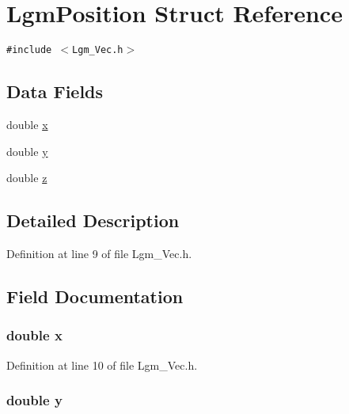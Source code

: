 \hypertarget{struct_lgm_position}{
\section{LgmPosition Struct Reference}
\label{struct_lgm_position}
}
{\tt \#include $<$Lgm\_\-Vec.h$>$}

\subsection*{Data Fields}
\begin{CompactItemize}
\item 
double \hyperlink{struct_lgm_position_f88b946fb90d5f08b5fb740c70e98c10}{x}
\item 
double \hyperlink{struct_lgm_position_b927965981178aa1fba979a37168db2a}{y}
\item 
double \hyperlink{struct_lgm_position_b3e6ed577a7c669c19de1f9c1b46c872}{z}
\end{CompactItemize}


\subsection{Detailed Description}


Definition at line 9 of file Lgm\_\-Vec.h.

\subsection{Field Documentation}
\hypertarget{struct_lgm_position_f88b946fb90d5f08b5fb740c70e98c10}{
\subsubsection[{x}]{\setlength{\rightskip}{0pt plus 5cm}double {\bf x}}}
\label{struct_lgm_position_f88b946fb90d5f08b5fb740c70e98c10}




Definition at line 10 of file Lgm\_\-Vec.h.\hypertarget{struct_lgm_position_b927965981178aa1fba979a37168db2a}{
\subsubsection[{y}]{\setlength{\rightskip}{0pt plus 5cm}double {\bf y}}}
\label{struct_lgm_position_b927965981178aa1fba979a37168db2a}




